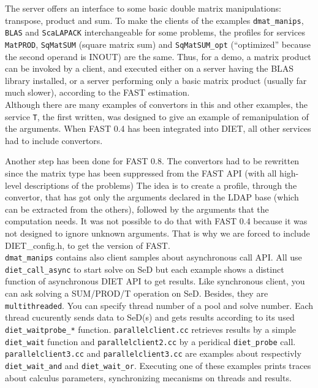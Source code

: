         The server offers an interface to some basic double matrix manipulations:
        transpose, product and sum. To make the clients of the examples
        \texttt{dmat\_manips}, \texttt{BLAS} and \texttt{ScaLAPACK} interchangeable for
        some problems, the profiles for services \texttt{MatPROD}, \texttt{SqMatSUM}
        (square matrix sum) and \texttt{SqMatSUM\_opt} (``optimized'' because the second
                                                        operand is INOUT) are the same. Thus, for a demo, a matrix product can be
        invoked by a client, and executed either on a server having the BLAS library
        installed, or a server performing only a basic matrix product (usually far much
            slower), according to the FAST estimation.
        \\

        Although there are many examples of convertors in this and other examples, the
        service \texttt{T}, the first written, was designed to give an example of
        remanipulation of the arguments. When FAST 0.4 has been integrated into DIET,
        all other services had to include convertors.

        Another step has been done for FAST 0.8. The convertors had to be rewritten
        since the matrix type has been suppressed from the FAST API (with all high-level
            descriptions of the problems) The idea is to create a profile, through the
        convertor, that has got only the arguments declared in the LDAP base (which can
            be extracted from the others), followed by the arguments that the computation
        needs. It was not possible to do that with FAST 0.4 because it was not designed
        to ignore unknown arguments. That is why we are forced to include
        \textsf{DIET\_config.h}, to get the version of FAST.
        \\

        \texttt{dmat\_manips} contains also client samples about asynchronous call API. All
        use \texttt{diet\_call\_async} to start solve on SeD but each example shows 
        a distinct function of asynchronous DIET API to get results. Like synchronous
        client, you can ask solving a SUM/PROD/T operation on SeD. Besides, they are 
        \texttt{multithreaded}. You can specify thread number of a pool and solve number. Each 
        thread cucurently sends data to SeD(s) and gets results according to its used
        \texttt{diet\_wait\/probe\_*} function.
        \texttt{parallelclient.cc} retrieves results by a simple \texttt{diet\_wait} function 
        and \texttt{parallelclient2.cc} by a peridical \texttt{diet\_probe} call.
        \texttt{parallelclient3.cc} and \texttt{parallelclient3.cc} are examples about
        respectivly \texttt{diet\_wait\_and} and \texttt{diet\_wait\_or}. Executing
        one of these examples prints traces about calculus parameters, synchronizing
        mecanisms on threads and results.

